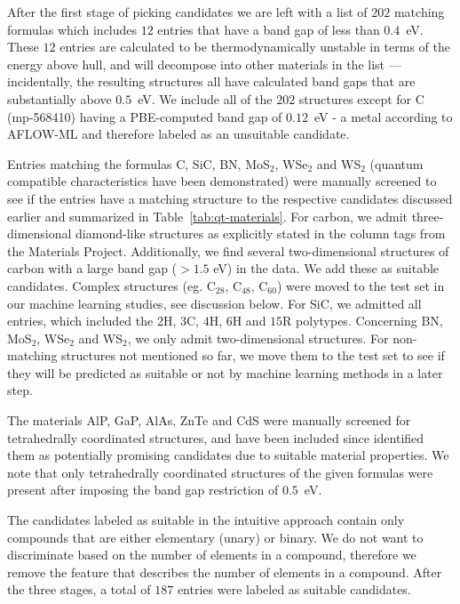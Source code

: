 \documentclass[superscriptaddress,unsortedaddress,
 amsmath,amssymb,
 aps,
]{revtex4-2}
\begin{document}
After the first stage of picking candidates we are left with a list of $202$ matching formulas which includes $12$ entries that have a band gap of less than $0.4$~eV. These $12$ entries are calculated to be thermodynamically unstable in terms of the energy above hull, and will decompose into other materials in the list --- incidentally, the resulting structures all have calculated band gaps that are substantially above $0.5$~eV. We include all of the $202$ structures except for C (mp-568410) having a PBE-computed band gap of $0.12$~eV - a metal according to AFLOW-ML and therefore labeled as an unsuitable candidate. 
 
Entries matching the formulas C, SiC, BN, MoS$_2$, WSe$_2$ and WS$_2$ (quantum compatible characteristics have been demonstrated) were manually screened to see if the entries have a matching structure to the respective candidates discussed earlier and summarized in Table~\ref{tab:qt-materials}. 
For carbon, we admit three-dimensional diamond-like structures as explicitly stated in the column tags from the Materials Project. Additionally, we find several two-dimensional structures of carbon with a large band gap ($>1.5$ eV) in the data. We add these as suitable candidates. Complex structures (eg. C$_{28}$, C$_{48}$, C$_{60}$) were moved to the test set in our machine learning studies, see discussion below. For SiC, we admitted all entries, which included the $2$H, $3$C, $4$H, $6$H and $15$R polytypes. Concerning BN, MoS$_2$, WSe$_2$ and WS$_2$, we only admit two-dimensional structures. For non-matching structures not mentioned so far, we move them to the test set to see if they will be predicted as suitable or not by machine learning methods in a later step.

The materials AlP, GaP, AlAs, ZnTe and CdS were manually screened for tetrahedrally coordinated structures, and have been included since \citeauthor{Weber2010} \cite{Weber2010} identified them as potentially promising candidates due to suitable material properties. 
We note that only tetrahedrally coordinated structures of the given formulas were present after imposing the band gap restriction of $0.5$~eV. 

The candidates labeled as suitable in the intuitive approach contain only compounds that are either elementary (unary) or binary. We do not want to discriminate based on the number of elements in a compound, therefore we remove the feature that describes the number of elements in a compound. After the three stages, a total of $187$ entries were labeled as suitable candidates. 
\end{document}
